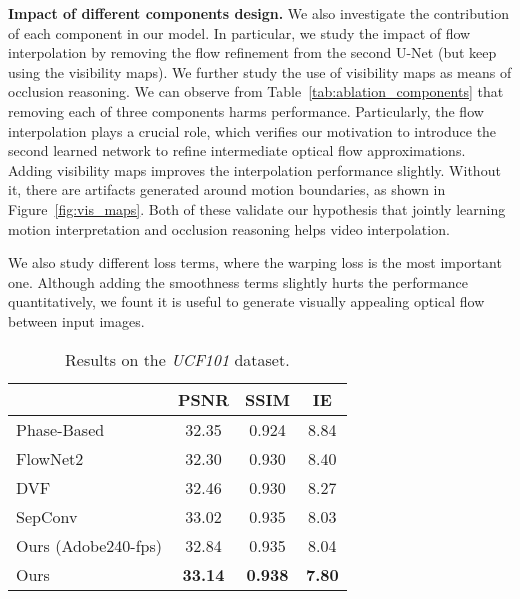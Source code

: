 \documentclass[10pt,twocolumn,letterpaper]{article}
\makeatletter
\def\fps{-fps\@\xspace}
\makeatother
\begin{document}
\noindent\textbf{Impact of different components design.} We also investigate the contribution of each component in our model. In particular, we study the impact of flow interpolation by removing the flow refinement from the second U-Net (but keep using the visibility maps). We further study the use of visibility maps as means of occlusion reasoning. We can observe from Table~\ref{tab:ablation_components} that removing each of three components harms performance. Particularly, the flow interpolation plays a crucial role, which verifies our motivation to introduce the second learned network to refine intermediate optical flow approximations. Adding visibility maps improves the interpolation performance slightly. Without it, there are artifacts generated around motion boundaries, as shown in Figure~\ref{fig:vis_maps}. Both of these validate our hypothesis that jointly learning motion interpretation and occlusion reasoning helps video interpolation.

We also study different loss terms, where the warping loss is the most important one. Although adding the smoothness terms slightly hurts the performance quantitatively, we fount it is useful to generate visually appealing optical flow between input images.


\begin{table}
\setlength{\belowcaptionskip}{-10pt}
\caption{Results on the \emph{UCF101} dataset.}
\label{tab:quant_comp_ucf101}
\centering
\begin{tabular}{lccc}
\toprule
 & PSNR & SSIM & IE \\
\midrule
Phase-Based~\cite{meyer15phase} & 32.35 & 0.924 & 8.84 \\
FlowNet2~\cite{baker11a,ilg16flownet2} & 32.30 & 0.930 & 8.40 \\
DVF~\cite{liu17video} & 32.46 & 0.930 & 8.27 \\
SepConv~\cite{niklaus17video_iccv} & 33.02 & 0.935 & 8.03 \\
\midrule
Ours (Adobe240\fps) & 32.84 & 0.935 & 8.04 \\
Ours & \textbf{33.14} & \textbf{0.938} & \textbf{7.80} \\
\bottomrule
\end{tabular}
\end{table}

\end{document}

